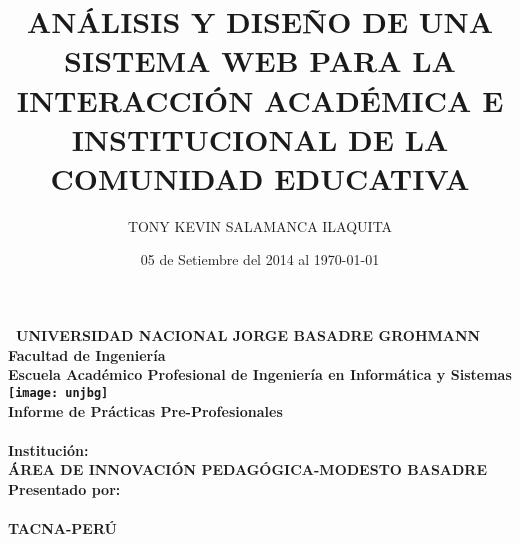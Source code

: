 \title{ANÁLISIS Y DISEÑO DE UNA SISTEMA WEB PARA LA INTERACCIÓN ACADÉMICA E INSTITUCIONAL DE LA COMUNIDAD EDUCATIVA}
\author{TONY KEVIN SALAMANCA ILAQUITA}
\date{05 de Setiembre del 2014 al \today}


\newcommand{\univname}{UNIVERSIDAD NACIONAL JORGE BASADRE GROHMANN}

\newcommand{\deptname}{Facultad de Ingeniería}

\newcommand{\college}{Escuela Académico Profesional de Ingeniería en Informática y Sistemas}

\newcommand{\subjectname}{Informe de Prácticas Pre-Profesionales}

\newcommand{\institutionname}{ÁREA DE INNOVACIÓN PEDAGÓGICA-MODESTO BASADRE}

\newcommand{\institutionaddress}{TACNA-PERÚ}




\begin{titlepage}

\begin{center}

\textbf{\
    \univname\\
    \vspace{.5cm}
    \deptname\\
    \vspace{1cm}
    \college\\
    \vspace{.5cm}
    \texttt{[image: unjbg]}\\
    \vspace{.5cm}
    \subjectname\\
    \vspace{.5cm}
    \thetitle\\
    \vspace{1cm}
    Institución:\\
    \vspace{.3cm}
    \institutionname\\
    \vspace{1cm}
    Presentado por:\\
    \vspace{.3cm}
    \theauthor\\
    \vspace{1cm}
    \thedate\vfill
    \institutionaddress\\
    \vspace{.3cm}
    \the\year{}
}

\end{center}
\end{titlepage}

\restoregeometry{}
